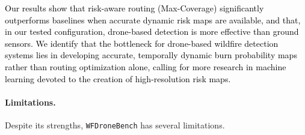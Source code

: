 \documentclass{article}
\newcommand{\blue}[1]{\textcolor{black}{#1}}
\begin{document}
\blue{Our results show that risk-aware routing (Max-Coverage) significantly outperforms baselines when accurate dynamic risk maps are available, and that, in our tested configuration, drone-based detection is more effective than ground sensors. We identify that the bottleneck for drone-based wildfire detection systems lies in developing accurate, temporally dynamic burn probability maps rather than routing optimization alone, calling for more research in machine learning devoted to the creation of high-resolution risk maps.}





\paragraph{Limitations.} Despite its strengths, \texttt{WFDroneBench} has several limitations.
\end{document}
